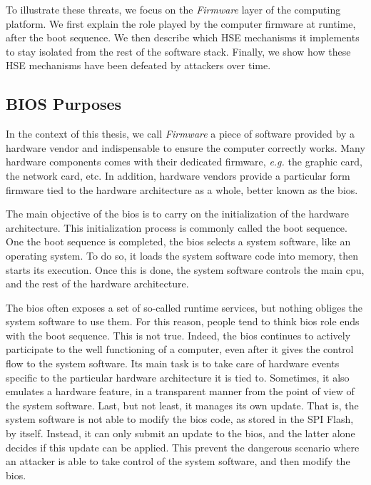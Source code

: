 To illustrate these threats, we focus on the \emph{Firmware} layer of the
computing platform.
%
We first explain the role played by the computer firmware at runtime, after the
boot sequence.
%
We then describe which HSE mechanisms it implements to stay isolated from the
rest of the software stack.
%
Finally, we show how these HSE mechanisms have been defeated by attackers over
time.

\subsection{BIOS Purposes}

In the context of this thesis, we call \emph{Firmware} a piece of software
provided by a hardware vendor and indispensable to ensure the computer correctly
works.
%
Many hardware components comes with their dedicated firmware, \emph{e.g.} the
graphic card, the network card, etc.
%
In addition, hardware vendors provide a particular form firmware tied to the
hardware architecture as a whole, better known as the \ac{bios}.

The main objective of the \ac{bios} is to carry on the initialization of the
hardware architecture.
%
This initialization process is commonly called the boot sequence.
%
One the boot sequence is completed, the \ac{bios} selects a system software,
like an operating system.
%
To do so, it loads the system software code into memory, then starts its
execution.
%
Once this is done, the system software controls the main \ac{cpu}, and the rest
of the hardware architecture.

The \ac{bios} often exposes a set of so-called runtime services, but nothing
obliges the system software to use them.
%
For this reason, people tend to think \ac{bios} role ends with the boot
sequence.
%
This is not true.
%
Indeed, the \ac{bios} continues to actively participate to the well functioning
of a computer, even after it gives the control flow to the system software.
%
Its main task is to take care of hardware events specific to the particular
hardware architecture it is tied to.
%
Sometimes, it also emulates a hardware feature, in a transparent manner from the
point of view of the system software.  
%
Last, but not least, it manages its own update.
%
That is, the system software is not able to modify the \ac{bios} code, as stored
in the SPI Flash, by itself.
%
Instead, it can only submit an update to the \ac{bios}, and the latter alone
decides if this update can be applied.
%
This prevent the dangerous scenario where an attacker is able to take control of
the system software, and then modify the \ac{bios}.

